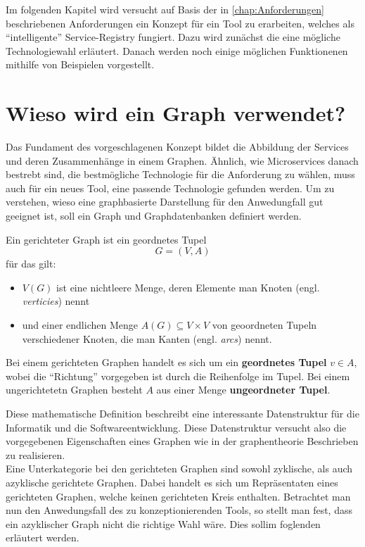 \documentclass[
	12pt,
	BCOR=5mm,
	DIV=12,
	headinclude=on,
	footinclude=off,
	parskip=half,
	bibliography=totoc,
	listof=entryprefix,
	toc=listof,
	numbers=noenddot,
	plainfootsepline
]{scrreprt}
\begin{document}
Im folgenden Kapitel wird versucht auf Basis der in \vref{chap:Anforderungen} beschriebenen Anforderungen ein Konzept für ein Tool zu erarbeiten, welches als \enquote{intelligente} Service-Registry fungiert. Dazu wird zunächst die eine mögliche Technologiewahl erläutert. Danach werden noch einige möglichen Funktionenen mithilfe von Beispielen vorgestellt.

\section{Wieso wird ein Graph verwendet?}

Das Fundament des vorgeschlagenen Konzept bildet die Abbildung der Services und deren Zusammenhänge in einem Graphen. Ähnlich, wie Microservices danach bestrebt sind, die bestmögliche Technologie für die Anforderung zu wählen, muss auch für ein neues Tool, eine passende Technologie gefunden werden. Um zu verstehen, wieso eine graphbasierte Darstellung für den Anwedungfall gut geeignet ist, soll ein Graph und Graphdatenbanken definiert werden.

\begin{definition}\autocite[Kapitel 1.2]{Bang-Jensen2007}
	Ein gerichteter Graph ist ein geordnetes Tupel $$G = (V,A)$$ für das gilt:
	\begin{itemize}
		\item $V(G)$ ist eine nichtleere Menge, deren Elemente man Knoten (engl. \textit{verticies}) nennt
		\item und einer endlichen Menge $A(G) \subseteq V \times V$ von geoordneten Tupeln verschiedener Knoten, die man Kanten (engl. \textit{arcs}) nennt.
	\end{itemize}

	Bei einem gerichteten Graphen handelt es sich um ein \textbf{geordnetes Tupel} $v \in A$, wobei die \enquote{Richtung} vorgegeben ist durch die Reihenfolge im Tupel. Bei einem ungerichtetetn Graphen besteht $A$ aus einer Menge \textbf{ungeordneter Tupel}.
\end{definition}

Diese mathematische Definition beschreibt eine interessante Datenstruktur für die Informatik und die Softwareentwicklung. Diese Datenstruktur versucht also die vorgegebenen Eigenschaften eines Graphen wie in der graphentheorie Beschrieben zu realisieren. \\
Eine Unterkategorie bei den gerichteten Graphen sind sowohl zyklische, als auch azyklische gerichtete Graphen. Dabei handelt es sich um Repräsentaten eines gerichteten Graphen, welche keinen gerichteten Kreis enthalten. Betrachtet man nun den Anwedungsfall des zu konzeptionierenden Tools, so stellt man fest, dass ein azyklischer Graph nicht die richtige Wahl wäre. Dies sollim foglenden erläutert werden.
\end{document}
